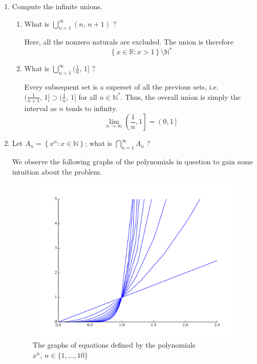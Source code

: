 \documentclass{article}
\newcommand{\R}{\mathbb{R}}
\newcommand{\N}{\mathbb{N}}
\begin{document}
\begin{enumerate}
    \item Compute the infinite unions.

        \begin{enumerate}
            \item What is $\bigcup_{n=1}^\infty (n,\, n+1)$ ?

                Here, all the nonzero naturals are excluded. The union is therefore
                \begin{equation*}
                    \left\{ x \in \R: x > 1\right\} \setminus \N^*
                \end{equation*}

            \item What is $\bigcup_{n=1}^\infty (\frac{1}{n},\, 1]$ ?

                Every subsequent set is a superset of all the previous sets, i.e. 
                $(\frac{1}{n+1},\, 1] \supset (\frac{1}{n},\, 1]$ for all $n \in \N^*$.
                Thus, the overall union is simply the interval as $n$ tends to infinity.
                \begin{equation*}
                    \lim_{n\to\infty} \left(\frac{1}{n}, 1\right] = \left(0, 1\right]
                \end{equation*}
        \end{enumerate}

    \item Let $A_n = \left\{ x^n : x \in \N \right\}$; what is 
        $\bigcap_{n=1}^\infty A_n$ ?

        We observe the following graphs of the polynomials in question to gain some
        intuition about the problem.

        \begin{figure}[h]
            \includegraphics[width=\textwidth]{polynomials.pdf}
            \caption{The graphs of equations defined by the polynomials 
                $x^n,\, n \in \{1, ..., 10\}$}
        \end{figure}


\end{enumerate}
\end{document}
